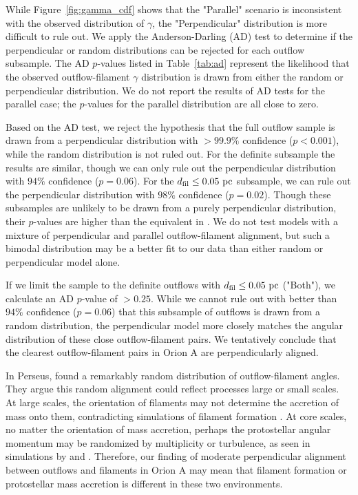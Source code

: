 \documentclass[twocolumn]{aastex63}
\begin{document}
While Figure~\ref{fig:gamma_cdf} shows that the "Parallel" scenario is inconsistent with the observed distribution of $\gamma$, the "Perpendicular" distribution is more difficult to rule out. We apply the Anderson-Darling (AD) test \citep{Stephens74} to determine if the perpendicular or random distributions can be rejected for each outflow subsample. The AD $p$-values listed in Table~\ref{tab:ad} represent the likelihood that the observed outflow-filament $\gamma$ distribution is drawn from either the random or perpendicular distribution. We do not report the results of AD tests for the parallel case; the $p$-values for the parallel distribution are all close to zero.

Based on the AD test, we reject the hypothesis that the full outflow sample is drawn from a perpendicular distribution with $>99.9\%$ confidence ($p < 0.001$), while the random distribution is not ruled out. For the definite subsample the results are similar, though we can only rule out the perpendicular distribution with $94\%$ confidence ($p = 0.06$). For the $d_{\rm fil} \leq 0.05~\rm{pc}$ subsample, we can rule out the perpendicular distribution with $98\%$ confidence ($p = 0.02$). Though these subsamples are unlikely to be drawn from a purely perpendicular distribution, their $p$-values are higher than the equivalent in \citet{Stephens17}. We do not test models with a mixture of perpendicular and parallel outflow-filament alignment, but such a bimodal distribution may be a better fit to our data than either random or perpendicular model alone.

If we limit the sample to the definite outflows with $d_{\rm fil} \leq 0.05~\rm{pc}$ ("Both"), we calculate an AD $p$-value of $> 0.25$. While we cannot rule out with better than $94\%$ confidence ($p = 0.06$) that this subsample of outflows is drawn from a random distribution, the perpendicular model more closely matches the angular distribution of these close outflow-filament pairs. We tentatively conclude that the clearest outflow-filament pairs in Orion A are perpendicularly aligned.

In Perseus, \citet{Stephens17} found a remarkably random distribution of outflow-filament angles. They argue this random alignment could reflect processes large or small scales. At large scales, the orientation of filaments may not determine the accretion of mass onto them, contradicting simulations of filament formation \citep[e.g.][]{Chen14,Clarke17}. At core scales, no matter the orientation of mass accretion, perhaps the protostellar angular momentum may be randomized by multiplicity or turbulence, as seen in simulations by \citet{Offner16} and \citet{Lee17}. Therefore, our finding of moderate perpendicular alignment between outflows and filaments in Orion A may mean that filament formation or protostellar mass accretion is different in these two environments.
\end{document}
